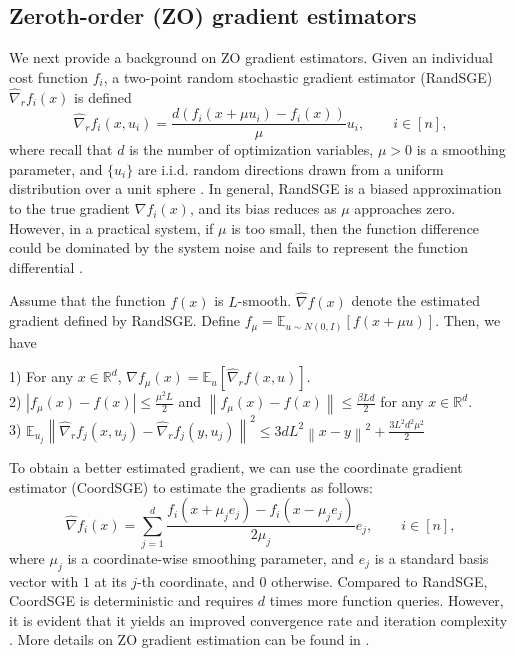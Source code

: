 \documentclass{article}
\newcommand*{\R}{\mathbb{R}}
\newcommand*{\E}{\mathbb{E}}
\newcommand{\norm}[1]{\left\lVert#1\right\rVert}
\newcommand{\abs}[1]{\left|#1\right|}
\theoremstyle{definition}
\theoremstyle{remark}
\begin{document}
\subsection{Zeroth-order (ZO) gradient estimators}

{\color{Brown}
We
next provide a background on ZO gradient estimators.
Given an individual cost function $f_i$, a two-point random stochastic gradient estimator (RandSGE) $\hat{\nabla}_r f_i(x)$ is defined \cite{nesterov2017random,gao2018information}
\begin{equation}\label{gradestrand}
\hat{\nabla}_r f_i(x, u_i) = \frac{d(f_i(x+\mu u_i) - f_i(x))}{\mu}u_i,\qquad i\in [n],
\end{equation}
where recall that $d$ is the number of optimization variables, $\mu > 0$ is a smoothing parameter, and
$\{u_i\}$ are i.i.d. random directions drawn from a uniform distribution over a unit sphere \cite{flaxman2005online,shamir2017optimal,gao2018information}. In general, RandSGE is a biased approximation to the true gradient $\nabla f_i(x)$, and its bias reduces as $\mu$ approaches zero. However, in a practical system, if $\mu$ is too small, then the function difference
could be dominated by the system noise and fails to represent the function differential \cite{lian2016comprehensive}.}

{\color{Melon}
Assume that the function $f(x)$ is $L$-smooth. $\hat{\nabla} f(x)$ denote the estimated gradient defined by RandSGE. Define $f_{\mu} = \E_{u\sim N(0, I)}[f(x+\mu u)]$. Then, we have 

1) For any $x \in \R^d$, $\nabla f_{\mu}(x) = \E_u[\hat{\nabla}_r f(x,u)]$.\\
2) $\abs{f_{\mu}(x) - f(x)} \leq \frac{\mu^2 L}{2}$ and 
$\norm{f_{\mu}(x) - f(x)} \leq \frac{\beta L d}{2}$ for any $x \in \R^d$.\\
3) $\E_{u_j}\norm{\hat{\nabla}_r f_j(x,u_j) - \hat{\nabla}_r f_j(y,u_j)}^2 \leq 3dL^2\norm{x-y}^2 + \frac{3L^2d^2\mu^2}{2}$
}

{\color{Green}
To obtain a better estimated gradient, we
can use the coordinate gradient estimator
(CoordSGE) \cite{gu2018inexact,gu2018faster,liu2018zeroth} to estimate the gradients as follows:
\begin{equation}\label{gradestcoord}
\hat{\nabla} f_i(x) = \sum_{j=1}^d \frac{f_i(x+\mu_je_j) - f_i(x-\mu_je_j)}{2\mu_j}e_j,\qquad i\in [n],
\end{equation}
where $\mu_j$ is a coordinate-wise smoothing parameter, and $e_j$ is a standard basis vector with $1$ at its $j$-th coordinate,
and $0$ otherwise. 
}
{\color{Brown}
Compared to RandSGE, CoordSGE is deterministic and requires $d$ times more function queries. 
However, it is evident that it yields an improved  convergence rate and iteration complexity \cite{liu2018zeroth}. More details on ZO gradient estimation can be found in \cite{kazemi2018proximal}.
}
 
\end{document}
